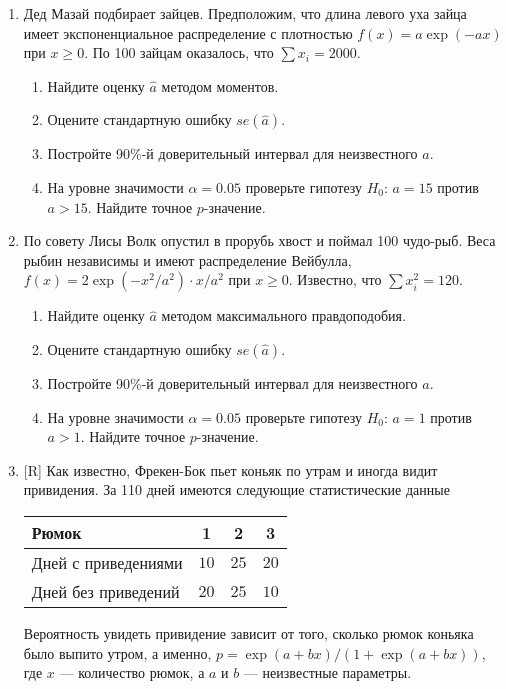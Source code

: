 \begin{enumerate}
\item Дед Мазай подбирает зайцев. Предположим, что длина левого уха зайца имеет
экспоненциальное распределение с плотностью $f(x)=a\exp(-ax)$ при $x\geq 0$. По
100 зайцам оказалось, что $\sum x_i=2000$.
\begin{enumerate}
\item Найдите оценку $\hat{a}$ методом моментов.
\item Оцените стандартную ошибку $se(\hat{a})$.
\item Постройте 90\%-й доверительный интервал для неизвестного $a$.
\item На уровне значимости $\alpha=0.05$ проверьте гипотезу $H_0$: $a=15$ против
$a>15$. Найдите точное $p$-значение.
\end{enumerate}

\item По совету Лисы Волк опустил в прорубь хвост и поймал 100 чудо-рыб. Веса
рыбин независимы и имеют распределение Вейбулла, $f(x)=2\exp(-x^2/a^2)\cdot x/a^2$
при $x\geq 0$. Известно, что $\sum x_i^2=120$.
\begin{enumerate}
\item Найдите оценку $\hat{a}$ методом максимального правдоподобия.
\item Оцените стандартную ошибку $se(\hat{a})$.
\item Постройте 90\%-й доверительный интервал для неизвестного $a$.
\item На уровне значимости $\alpha=0.05$ проверьте гипотезу $H_0$: $a=1$ против
$a>1$. Найдите точное $p$-значение.
\end{enumerate}

\item $[$R] Как известно, Фрекен-Бок пьет коньяк по утрам и иногда видит привидения.
За 110 дней имеются следующие статистические данные

\begin{tabular}{@{}lccc@{}}
\toprule
Рюмок               & 1    & 2    & 3    \\ \midrule
Дней с приведениями & $10$ & $25$ & $20$ \\
Дней без приведений & $20$ & $25$ & $10$ \\ \bottomrule
\end{tabular}

Вероятность увидеть привидение зависит от того, сколько рюмок коньяка было выпито
утром, а именно, $p=\exp(a+bx)/(1+ \exp(a+bx))$, где $x$ — количество рюмок, а $a$
и $b$ — неизвестные параметры.


\end{enumerate}
